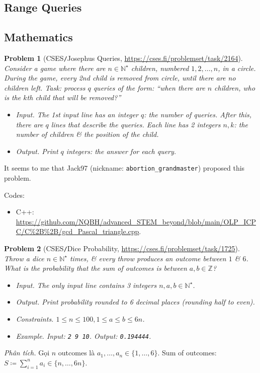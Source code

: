 \documentclass{article}
\newtheorem{problem}{Problem}
\begin{document}
\subsection{Range Queries}

\subsection{Mathematics}

\begin{problem}[CSES{\tt/}Josephus Queries, \url{https://cses.fi/problemset/task/2164}]
	Consider a game where there are $n\in\mathbb{N}^\star$ children, numbered $1,2,\ldots,n$, in a circle. During the game, every 2nd child is removed from circle, until there are no children left. Task: process $q$ queries of the form: ``when there are $n$ children, who is the $k$th child that will be removed?''
	\begin{itemize}
		\item {\sf Input.} The 1st input line has an integer $q$: the number of queries. After this, there are $q$ lines that describe the queries. Each line has 2 integers $n,k$: the number of children \& the position of the child.
		\item {\sf Output.} Print $q$ integers: the answer for each query.
	\end{itemize}
\end{problem}
It seems to me that {\sf Jack97} (nickname: \verb|abortion_grandmaster|) proposed this problem.

Codes:
\begin{itemize}
	\item C++: \url{https://github.com/NQBH/advanced_STEM_beyond/blob/main/OLP_ICPC/C%2B%2B/gcd_Pascal_triangle.cpp}.
\end{itemize}

\begin{problem}[CSES{\tt/}Dice Probability, \url{https://cses.fi/problemset/task/1725}]
	Throw a dice $n\in\mathbb{N}^\star$ times, \& every throw produces an outcome between $1$ \& $6$. What is the probability that the sum of outcomes is between $a,b\in\mathbb{Z}$?
	\begin{itemize}
		\item {\sf Input.} The only input line contains 3 integers $n,a,b\in\mathbb{N}^\star$.
		\item {\sf Output.} Print probability rounded to 6 decimal places (rounding half to even).
		\item {\sf Constraints.} $1\le n\le100,1\le a\le b\le6n$.
		\item {\sf Example.} Input: {\tt2 9 10}. Output: {\tt0.194444}.
	\end{itemize}
\end{problem}
{\it Phân tích.} Gọi $n$ outcomes là $a_1,\ldots,a_n\in\{1,\ldots,6\}$. Sum of outcomes: $S\coloneqq\sum_{i=1}^n a_i\in\{n,\ldots,6n\}$.
\end{document}
